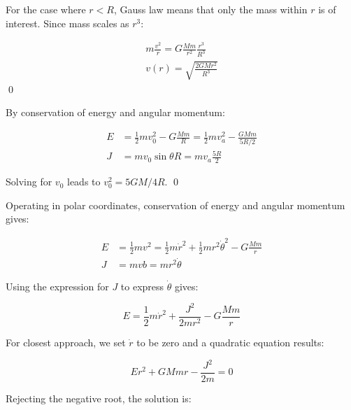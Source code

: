 \documentclass[12pt]{article}
\begin{document}
For the case where $r < R$, Gauss law means that only the mass within $r$ is of interest. Since mass scales as $r^{3}$:

\begin{equation}
\begin{split}
    m \frac{v^{2}}{r} = G \frac{Mm}{r^{2}} \frac{r^{3}}{R^{3}} \\
    v(r) = \sqrt{\frac{2GMr^{2}}{R^{3}}}
\end{split}
\end{equation}
\qed


By conservation of energy and angular momentum:

\begin{equation}
\begin{split}
    E &= \frac{1}{2} mv_{0}^{2} - G \frac{Mm}{R} = \frac{1}{2} mv_{a}^{2} - \frac{GMm}{5R/2} \\
    J &= mv_{0}\sin{\theta}R = mv_{a} \frac{5R}{2}
\end{split}
\end{equation}

Solving for $v_{0}$ leads to $v_{0}^{2} = 5GM/4R$.
\qed



Operating in polar coordinates, conservation of energy and angular momentum gives:

\begin{equation}
\begin{split}
    E &= \frac{1}{2} m v^{2} = \frac{1}{2} m \dot{r}^{2} + \frac{1}{2}m r^{2} \dot{\theta}^{2} - G \frac{Mm}{r} \\
    J &= mvb = m r^{2} \dot{\theta}
\end{split}
\end{equation}

Using the expression for $J$ to express $\dot{\theta}$ gives:

\begin{equation}
    E = \frac{1}{2} m \dot{r}^{2} + \frac{J^{2}}{2mr^{2}} - G \frac{Mm}{r}
\end{equation}

For closest approach, we set $\dot{r}$ to be zero and a quadratic equation results:

\begin{equation}
    Er^{2} + GMmr - \frac{J^{2}}{2m} = 0
\end{equation}

Rejecting the negative root, the solution is:
\end{document}
